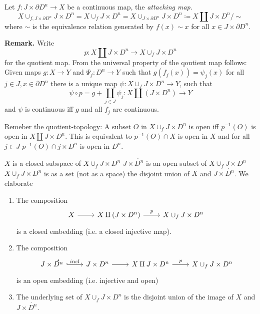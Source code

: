 \documentclass{TemplateLecture}
\begin{document}
\begin{defi}{}{}
    Let \(f \colon J\times \partial D^n \to X\) be a continuous map, the \emph{attaching map}.
    \[X\cup_{f, J\times \partial D^n} J\times D^n = X \cup_f J\times D^n = X \cup_{J\times \partial D^n} J \times D^n \coloneq X \amalg J\times D^n /\sim\]
    where \(\sim\) is the equivalence relation generated by \(f(x) \sim x\) for all \(x \in J\times \partial D^n\).
\end{defi}



\textbf{Remark.} Write
\[p\colon X \amalg J\times D^n \to X\cup_f J\times D^n\]
for the quotient map. From the universal property of the qoutient map follows: Given maps \(g \colon X \to Y\) and \(\Psi_j \colon D^n \to Y\) such that \(g(f_j(x)) = \psi_j(x)\) for all \(j \in J, x \in \partial D^n\) there is a unique map \(\psi\colon X\cup_f J\times D^n \to Y\), such that
\[\psi \circ p = g + \coprod_{j \in J} \psi_j \colon X \amalg (J\times D^n) \to Y\]
and \(\psi\) is continuous iff \(g\) and all \(f_j\) are continuous.

Remeber the quotient-topology: A subset \(O\) in \(X \cup_f J\times D^n\) is open iff \(p^{-1}(O)\) is open in \(X \amalg J\times D^n\). This is equivalent to \(p^{-1}(O) \cap X\) is open in \(X\) and for all \(j \in J\) \(p^{-1}(O) \cap j \times D^n\) is open in \(D^n\).


\(X\) is a closed subspace of \(X\cup_f J\times D^n\) \(J \times \mathring{D^n}\) is an open subset of \(X\cup_f J\times D^n\)
\(X \cup_f J\times D^n\) is as a set (not as a space) the disjoint union of \(X\) and \(J\times \mathring{D^n}\).
We elaborate

\begin{proposition}
    \begin{enumerate}
        \item The composition
        \[\begin{tikzcd}
            X \ar[r] & X\amalg (J\times D^n) \ar[r, "p"] & X\cup_f J\times D^n
        \end{tikzcd}\]
        is a closed embedding (i.e. a closed injective map).
        \item The composition 
        \[\begin{tikzcd}
            J\times \mathring{D^n} \ar[r, hook, "incl"] & J\times D^n \ar[r] & X\amalg J\times D^n \ar[r, "p"] & X \cup_f J \times D^n
        \end{tikzcd}\]
        is an open embedding (i.e. injective and open)
        \item The underlying set of \(X\cup_f J\times D^n\) is the disjoint union of the image of \(X\) and \(J\times \mathring{D^n}\).
    \end{enumerate}
\end{proposition}
\end{document}
